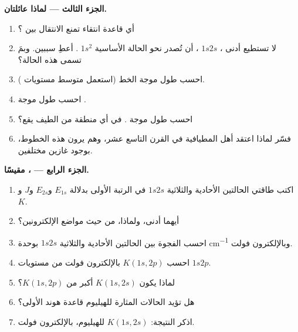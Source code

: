\begin{problem}
\medskip\noindent\textbf{الجزء الثالث --- لماذا عائلتان.}
\begin{enumerate}[resume]
  \item أي قاعدة انتقاء تمنع الانتقال بين  ؟
  \item لا تستطيع أدنى ، $1s2s$ ، أن تُصدر نحو الحالة
        الأساسية $1s^2$ . أعطِ سببين. وبمَ تسمى هذه
        الحالة؟
  \item احسب طول موجة الخط  (استعمل
        متوسط مستويات ).
  \item احسب طول موجة .
  \item احسب طول موجة . في أي
        منطقة من الطيف يقع؟
  \item فسّر لماذا اعتقد أهل المطيافية في القرن التاسع عشر، وهم يرون هذه الخطوط،
        بوجود غازين مختلفين.
\end{enumerate}

\medskip\noindent\textbf{الجزء الرابع --- ، مقيسًا.}
\begin{enumerate}[resume]
  \item اكتب طاقتي الحالتين الأحادية والثلاثية $1s2s$ في الرتبة الأولى
        بدلالة $E_{1s}$ و$E_{2s}$ و$J$ و$K$.
  \item أيهما أدنى، ولماذا، من حيث مواضع الإلكترونين؟
  \item احسب الفجوة بين الحالتين الأحادية والثلاثية $1s2s$ بوحدة \unit{cm^{-1}} وبالإلكترون فولت.
  \item احسب $K(1s,2p)$ بالإلكترون فولت من مستويات $1s2p$.
  \item لماذا يكون $K(1s,2s)$ أكبر من $K(1s,2p)$؟
  \item هل تؤيد الحالات المثارة للهيليوم قاعدة هوند الأولى؟
  \item اذكر النتيجة:  $K(1s,2s)$ للهيليوم، بالإلكترون
        فولت.
\end{enumerate}
\end{problem}
